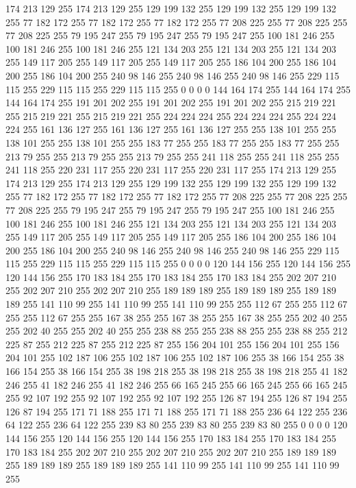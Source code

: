 174 213 129 255 174 213 129 255 129 199 132 255 129 199 132 255 129 199 132 255 77 182 172 255 77 182 172 255 77 182 172 255 77 208 225 255 77 208 225 255 77 208 225 255 79 195 247 255 79 195 247 255 79 195 247 255 100 181 246 255 100 181 246 255
100 181 246 255 121 134 203 255 121 134 203 255 121 134 203 255 149 117 205 255 149 117 205 255 149 117 205 255 186 104 200 255 186 104 200 255 186 104 200 255 240 98 146 255 240 98 146 255 240 98 146 255 229 115 115 255 229 115 115 255 229 115 115 255
0 0 0 0 144 164 174 255 144 164 174 255 144 164 174 255 191 201 202 255 191 201 202 255 191 201 202 255 215 219 221 255 215 219 221 255 215 219 221 255 224 224 224 255 224 224 224 255 224 224 224 255 161 136 127 255 161 136 127 255 161 136 127 255
255 138 101 255 255 138 101 255 255 138 101 255 255 183 77 255 255 183 77 255 255 183 77 255 255 213 79 255 255 213 79 255 255 213 79 255 255 241 118 255 255 241 118 255 255 241 118 255 220 231 117 255 220 231 117 255 220 231 117 255 174 213 129 255
174 213 129 255 174 213 129 255 129 199 132 255 129 199 132 255 129 199 132 255 77 182 172 255 77 182 172 255 77 182 172 255 77 208 225 255 77 208 225 255 77 208 225 255 79 195 247 255 79 195 247 255 79 195 247 255 100 181 246 255 100 181 246 255
100 181 246 255 121 134 203 255 121 134 203 255 121 134 203 255 149 117 205 255 149 117 205 255 149 117 205 255 186 104 200 255 186 104 200 255 186 104 200 255 240 98 146 255 240 98 146 255 240 98 146 255 229 115 115 255 229 115 115 255 229 115 115 255
0 0 0 0 120 144 156 255 120 144 156 255 120 144 156 255 170 183 184 255 170 183 184 255 170 183 184 255 202 207 210 255 202 207 210 255 202 207 210 255 189 189 189 255 189 189 189 255 189 189 189 255 141 110 99 255 141 110 99 255 141 110 99 255
255 112 67 255 255 112 67 255 255 112 67 255 255 167 38 255 255 167 38 255 255 167 38 255 255 202 40 255 255 202 40 255 255 202 40 255 255 238 88 255 255 238 88 255 255 238 88 255 212 225 87 255 212 225 87 255 212 225 87 255 156 204 101 255
156 204 101 255 156 204 101 255 102 187 106 255 102 187 106 255 102 187 106 255 38 166 154 255 38 166 154 255 38 166 154 255 38 198 218 255 38 198 218 255 38 198 218 255 41 182 246 255 41 182 246 255 41 182 246 255 66 165 245 255 66 165 245 255
66 165 245 255 92 107 192 255 92 107 192 255 92 107 192 255 126 87 194 255 126 87 194 255 126 87 194 255 171 71 188 255 171 71 188 255 171 71 188 255 236 64 122 255 236 64 122 255 236 64 122 255 239 83 80 255 239 83 80 255 239 83 80 255
0 0 0 0 120 144 156 255 120 144 156 255 120 144 156 255 170 183 184 255 170 183 184 255 170 183 184 255 202 207 210 255 202 207 210 255 202 207 210 255 189 189 189 255 189 189 189 255 189 189 189 255 141 110 99 255 141 110 99 255 141 110 99 255
